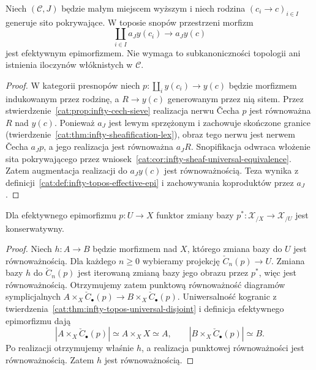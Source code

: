 \begin{wniosek}\label{cat:cor:infty-topos-covering-epi}
Niech $(\mathcal C,J)$ będzie małym miejscem wyższym i niech rodzina $(c_i\to c)_{i\in I}$ generuje sito pokrywające. W toposie snopów przestrzeni morfizm
\[
 \coprod_{i\in I}a_J y(c_i)\longrightarrow a_J y(c)
\]
jest efektywnym epimorfizmem. Nie wymaga to subkanoniczności topologii ani istnienia iloczynów włóknistych w $\mathcal C$.
\end{wniosek}
\begin{proof}
W kategorii presnopów niech $p:\coprod_i y(c_i)\to y(c)$ będzie morfizmem indukowanym przez rodzinę, a $R\to y(c)$ generowanym przez nią sitem. Przez stwierdzenie~\ref{cat:prop:infty-cech-sieve} realizacja nerwu Čecha $p$ jest równoważna $R$ nad $y(c)$. Ponieważ $a_J$ jest lewym sprzężonym i zachowuje skończone granice (twierdzenie~\ref{cat:thm:infty-sheafification-lex}), obraz tego nerwu jest nerwem Čecha $a_Jp$, a jego realizacja jest równoważna $a_JR$. Snopifikacja odwraca włożenie sita pokrywającego przez wniosek~\ref{cat:cor:infty-sheaf-universal-equivalence}. Zatem augmentacja realizacji do $a_Jy(c)$ jest równoważnością. Teza wynika z definicji~\ref{cat:def:infty-topos-effective-epi} i zachowywania koproduktów przez $a_J$.
\end{proof}

\begin{stwierdzenie}\label{cat:prop:infty-topos-epi-conservative}
Dla efektywnego epimorfizmu $p:U\to X$ funktor zmiany bazy $p^*:\mathcal X_{/X}\to\mathcal X_{/U}$ jest konserwatywny.
\end{stwierdzenie}
\begin{proof}
Niech $h:A\to B$ będzie morfizmem nad $X$, którego zmiana bazy do $U$ jest równoważnością. Dla każdego $n\geq0$ wybieramy projekcję $\check C_n(p)\to U$. Zmiana bazy $h$ do $\check C_n(p)$ jest iterowaną zmianą bazy jego obrazu przez $p^*$, więc jest równoważnością. Otrzymujemy zatem punktową równoważność diagramów symplicjalnych $A\times_X\check C_\bullet(p)\to B\times_X\check C_\bullet(p)$. Uniwersalność kogranic z twierdzenia~\ref{cat:thm:infty-topos-universal-disjoint} i definicja efektywnego epimorfizmu dają
\[
 |A\times_X\check C_\bullet(p)|\simeq A\times_X X\simeq A,
 \qquad
 |B\times_X\check C_\bullet(p)|\simeq B.
\]
Po realizacji otrzymujemy właśnie $h$, a realizacja punktowej równoważności jest równoważnością. Zatem $h$ jest równoważnością.
\end{proof}

